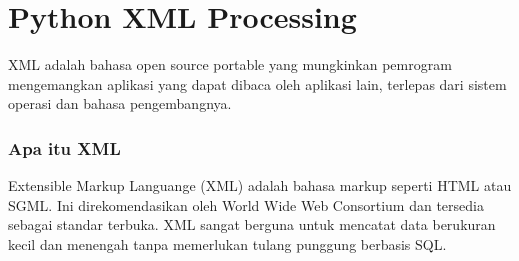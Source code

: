 

\section{Python XML Processing}
  XML adalah bahasa open source portable yang mungkinkan pemrogram mengemangkan aplikasi yang dapat dibaca oleh aplikasi lain, 
terlepas dari sistem operasi dan bahasa pengembangnya.
\subsubsection{Apa itu XML}
  Extensible Markup Languange (XML) adalah bahasa markup seperti HTML atau SGML. 
Ini direkomendasikan oleh World Wide Web Consortium dan tersedia sebagai standar terbuka.
XML sangat berguna untuk mencatat data berukuran kecil dan menengah tanpa memerlukan tulang punggung berbasis SQL. 
  
